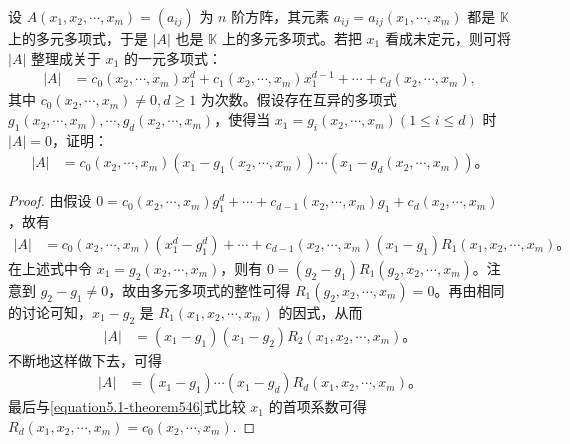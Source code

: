 \documentclass[../../main.tex]{subfiles}%
\begin{document}
\begin{theorem}[行列式的求根法]\label{theorem:行列式的求根法}
设 $A(x_1, x_2, \cdots, x_m) = (a_{ij})$ 为 $n$ 阶方阵，其元素 $a_{ij} = a_{ij}(x_1, \cdots, x_m)$ 都是 $\mathbb{K}$ 上的多元多项式，于是 $|A|$ 也是 $\mathbb{K}$ 上的多元多项式。若把 $x_1$ 看成未定元，则可将 $|A|$ 整理成关于 $x_1$ 的一元多项式：
\begin{align}
|A| &= c_0(x_2, \cdots, x_m)x_1^d + c_1(x_2, \cdots, x_m)x_1^{d-1} + \cdots + c_d(x_2, \cdots, x_m),\label{equation5.1-theorem546}
\end{align}
其中 $c_0(x_2, \cdots, x_m) \neq 0, d \geqslant  1$ 为次数。假设存在互异的多项式 $g_1(x_2, \cdots, x_m), \cdots, g_d(x_2, \cdots, x_m)$，使得当 $x_1 = g_i(x_2, \cdots, x_m) (1 \leqslant  i \leqslant  d)$ 时 $|A| = 0$，证明：
\begin{align*}
|A| &= c_0(x_2, \cdots, x_m)(x_1 - g_1(x_2, \cdots, x_m)) \cdots (x_1 - g_d(x_2, \cdots, x_m))。
\end{align*}
\end{theorem}
\begin{proof}
由假设 $0 = c_0(x_2, \cdots, x_m)g_1^d + \cdots + c_{d-1}(x_2, \cdots, x_m)g_1 + c_d(x_2, \cdots, x_m)$，故有
\begin{align*}
|A| &= c_0(x_2, \cdots, x_m)(x_1^d - g_1^d) + \cdots + c_{d-1}(x_2, \cdots, x_m)(x_1 - g_1)R_1(x_1, x_2, \cdots, x_m)。
\end{align*}
在上述式中令 $x_1 = g_2(x_2, \cdots, x_m)$，则有 $0 = (g_2 - g_1)R_1(g_2, x_2, \cdots, x_m)$。注意到 $g_2 - g_1 \neq 0$，故由多元多项式的整性可得 $R_1(g_2, x_2, \cdots, x_m) = 0$。再由相同的讨论可知，$x_1 - g_2$ 是 $R_1(x_1, x_2, \cdots, x_m)$ 的因式，从而
\begin{align*}
|A| &= (x_1 - g_1)(x_1 - g_2)R_2(x_1, x_2, \cdots, x_m)。
\end{align*}
不断地这样做下去，可得
\begin{align*}
|A| &= (x_1 - g_1) \cdots (x_1 - g_d)R_d(x_1, x_2, \cdots, x_m)。
\end{align*}
最后与\eqref{equation5.1-theorem546}式比较 $x_1$ 的首项系数可得 $R_d(x_1, x_2, \cdots, x_m) = c_0(x_2, \cdots, x_m)$.
\end{proof}
\end{document}
